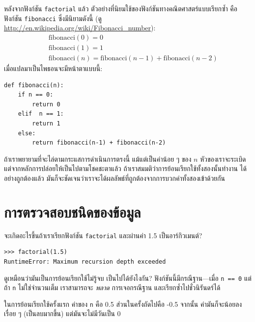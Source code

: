 
หลังจากฟังก์ชัน {\tt factorial} แล้ว ตัวอย่างที่นิยมใช้ของฟังก์ชันทางคณิตศาสตร์แบบเรียกซ้ำ คือ ฟังก์ชัน {\tt fibonacci}
ซึ่งมีนิยามดังนี้ (ดู \url{http://en.wikipedia.org/wiki/Fibonacci_number}):
%
\begin{eqnarray*}
&& \mathrm{fibonacci}(0) = 0 \\
&& \mathrm{fibonacci}(1) = 1 \\
&& \mathrm{fibonacci}(n) = \mathrm{fibonacci}(n-1) + \mathrm{fibonacci}(n-2)
\end{eqnarray*}
%
เมื่อแปลมาเป็นไพธอนจะมีหน้าตาแบบนี้:

\begin{verbatim}
def fibonacci(n):
    if n == 0:
        return 0
    elif  n == 1:
        return 1
    else:
        return fibonacci(n-1) + fibonacci(n-2)
\end{verbatim}
%
ถ้าเราพยายามที่จะไล่ตามกระแสการดำเนินการตรงนี้ แม้แต่เป็นค่าน้อย ๆ ของ {\scriptsize$n$} หัวของเราจะระเบิด
แต่จากหลักการปล่อยให้เป็นไปตามโชคชะตาแล้ว ถ้าเราสมมติว่าการย้อนเรียกใช้ทั้งสองนั้นทำงาน
ได้อย่างถูกต้องแล้ว มันก็จะชัดเจนว่าเราจะได้ผลลัพธ์ที่ถูกต้องจากการบวกค่าทั้งสองเข้าด้วยกัน


\section{การตรวจสอบชนิดของข้อมูล} %
\label{guardian}

จะเกิดอะไรขึ้นถ้าเราเรียกฟังก์ชัน {\tt factorial} และผ่านค่า 1.5 เป็นอาร์กิวเมนต์?

\begin{verbatim}
>>> factorial(1.5)
RuntimeError: Maximum recursion depth exceeded
\end{verbatim}
% 
ดูเหมือนว่ามันเป็นการย้อนเรียกใช้ไม่รู้จบ เป็นไปได้ยังไงกัน? ฟังก์ชันนี้มีกรณีฐาน---เมื่อ {\tt n == 0}
แต่ถ้า {\tt n} ไม่ใช่จำนวนเต็ม เราสามารถจะ {\em พลาด} การเจอกรณีฐาน และเรียกซ้ำไปชั่วนิรันดร์ได้

ในการย้อนเรียกใช้ครั้งแรก ค่าของ {\tt n} คือ 0.5 ส่วนในครั้งถัดไปคือ -0.5
จากนั้น ค่ามันก็จะน้อยลงเรื่อย ๆ (เป็นลบมากขึ้น) แต่มันจะไม่มีวันเป็น 0

